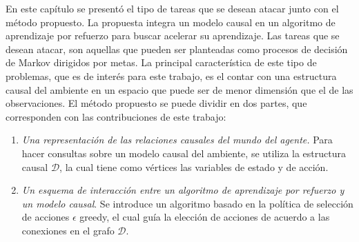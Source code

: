 En este capítulo se presentó el tipo de tareas que se 
desean atacar junto con el método propuesto. La propuesta
integra un modelo causal en un algoritmo de aprendizaje por refuerzo para
buscar acelerar su aprendizaje.
Las tareas que se desean atacar, son aquellas que pueden ser 
planteadas como procesos de decisión de Markov dirigidos por metas.
La principal característica de este tipo de problemas, que es de interés para este trabajo,
es el contar con una estructura causal del ambiente en un espacio 
que puede ser de menor dimensión que el de las observaciones.
El método propuesto se puede dividir en dos partes, que
corresponden con las contribuciones de este trabajo:

\begin{enumerate}
    \item \textit{Una representación de las relaciones causales del mundo del agente.} Para hacer consultas sobre un modelo causal del ambiente, se utiliza la estructura causal $\mathcal{D}$, la cual tiene como vértices las variables de estado y de acción.
    \item  \textit{Un esquema de interacción entre un algoritmo de aprendizaje por refuerzo
    y un modelo causal}. Se introduce un algoritmo basado en la política de selección
    de acciones $\epsilon$ greedy, el cual guía la elección de acciones de acuerdo
    a las conexiones en el grafo $\mathcal{D}$.
\end{enumerate}

